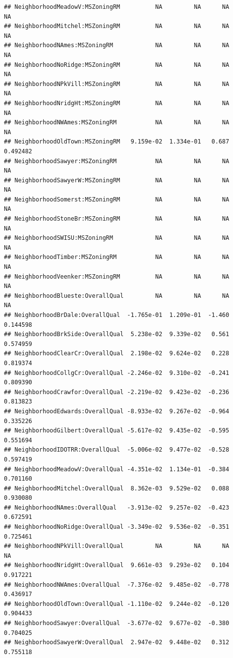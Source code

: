 \documentclass[american,]{article}
\theoremstyle{definition}
\theoremstyle{definition}
\theoremstyle{definition}
\theoremstyle{remark}
\begin{document}
\begin{verbatim}
## NeighborhoodMeadowV:MSZoningRM          NA         NA      NA       NA    
## NeighborhoodMitchel:MSZoningRM          NA         NA      NA       NA    
## NeighborhoodNAmes:MSZoningRM            NA         NA      NA       NA    
## NeighborhoodNoRidge:MSZoningRM          NA         NA      NA       NA    
## NeighborhoodNPkVill:MSZoningRM          NA         NA      NA       NA    
## NeighborhoodNridgHt:MSZoningRM          NA         NA      NA       NA    
## NeighborhoodNWAmes:MSZoningRM           NA         NA      NA       NA    
## NeighborhoodOldTown:MSZoningRM   9.159e-02  1.334e-01   0.687 0.492482    
## NeighborhoodSawyer:MSZoningRM           NA         NA      NA       NA    
## NeighborhoodSawyerW:MSZoningRM          NA         NA      NA       NA    
## NeighborhoodSomerst:MSZoningRM          NA         NA      NA       NA    
## NeighborhoodStoneBr:MSZoningRM          NA         NA      NA       NA    
## NeighborhoodSWISU:MSZoningRM            NA         NA      NA       NA    
## NeighborhoodTimber:MSZoningRM           NA         NA      NA       NA    
## NeighborhoodVeenker:MSZoningRM          NA         NA      NA       NA    
## NeighborhoodBlueste:OverallQual         NA         NA      NA       NA    
## NeighborhoodBrDale:OverallQual  -1.765e-01  1.209e-01  -1.460 0.144598    
## NeighborhoodBrkSide:OverallQual  5.238e-02  9.339e-02   0.561 0.574959    
## NeighborhoodClearCr:OverallQual  2.198e-02  9.624e-02   0.228 0.819374    
## NeighborhoodCollgCr:OverallQual -2.246e-02  9.310e-02  -0.241 0.809390    
## NeighborhoodCrawfor:OverallQual -2.219e-02  9.423e-02  -0.236 0.813823    
## NeighborhoodEdwards:OverallQual -8.933e-02  9.267e-02  -0.964 0.335226    
## NeighborhoodGilbert:OverallQual -5.617e-02  9.435e-02  -0.595 0.551694    
## NeighborhoodIDOTRR:OverallQual  -5.006e-02  9.477e-02  -0.528 0.597419    
## NeighborhoodMeadowV:OverallQual -4.351e-02  1.134e-01  -0.384 0.701160    
## NeighborhoodMitchel:OverallQual  8.362e-03  9.529e-02   0.088 0.930080    
## NeighborhoodNAmes:OverallQual   -3.913e-02  9.257e-02  -0.423 0.672591    
## NeighborhoodNoRidge:OverallQual -3.349e-02  9.536e-02  -0.351 0.725461    
## NeighborhoodNPkVill:OverallQual         NA         NA      NA       NA    
## NeighborhoodNridgHt:OverallQual  9.661e-03  9.293e-02   0.104 0.917221    
## NeighborhoodNWAmes:OverallQual  -7.376e-02  9.485e-02  -0.778 0.436917    
## NeighborhoodOldTown:OverallQual -1.110e-02  9.244e-02  -0.120 0.904433    
## NeighborhoodSawyer:OverallQual  -3.677e-02  9.677e-02  -0.380 0.704025    
## NeighborhoodSawyerW:OverallQual  2.947e-02  9.448e-02   0.312 0.755118    

\end{verbatim}
\end{document}
